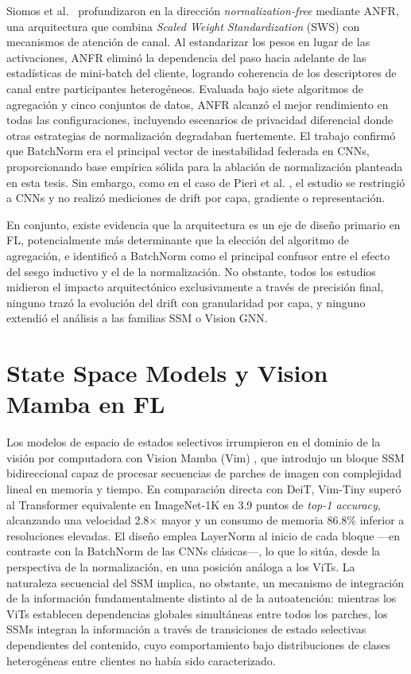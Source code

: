 Siomos et al.\ \cite{siomos2024architecture} profundizaron en la dirección
\textit{normalization-free} mediante ANFR, una arquitectura que combina \textit{Scaled Weight
Standardization} (SWS) con mecanismos de atención de canal.
Al estandarizar los pesos en lugar de las activaciones, ANFR eliminó la dependencia del paso
hacia adelante de las estadísticas de mini-batch del cliente, logrando coherencia de los
descriptores de canal entre participantes heterogéneos.
Evaluada bajo siete algoritmos de agregación y cinco conjuntos de datos, ANFR alcanzó el mejor
rendimiento en todas las configuraciones, incluyendo escenarios de privacidad diferencial donde
otras estrategias de normalización degradaban fuertemente.
El trabajo confirmó que BatchNorm era el principal vector de inestabilidad federada en CNNs,
proporcionando base empírica sólida para la ablación de normalización planteada en esta tesis.
Sin embargo, como en el caso de Pieri et al. \cite{pieri2023handlingdataheterogeneityarchitectural}, el estudio se restringió a CNNs y no realizó
mediciones de drift por capa, gradiente o representación.

En conjunto, existe evidencia que la arquitectura es un eje de diseño primario en FL,
potencialmente más determinante que la elección del algoritmo de agregación, e identificó a
BatchNorm como el principal confusor entre el efecto del sesgo inductivo y el de la normalización.
No obstante, todos los estudios midieron el impacto arquitectónico exclusivamente a través de
precisión final, ninguno trazó la evolución del drift con granularidad por capa, y ninguno
extendió el análisis a las familias SSM o Vision GNN.


\section{State Space Models y Vision Mamba en FL}

Los modelos de espacio de estados selectivos irrumpieron en el dominio de la visión por computadora
con Vision Mamba (Vim) \cite{zhu2024vision}, que introdujo un bloque SSM bidireccional capaz de
procesar secuencias de parches de imagen con complejidad lineal en memoria y tiempo.
En comparación directa con DeiT, Vim-Tiny superó al Transformer equivalente en ImageNet-1K en
3.9 puntos de \textit{top-1 accuracy}, alcanzando una velocidad 2.8$\times$ mayor y un consumo
de memoria 86.8\% inferior a resoluciones elevadas.
El diseño emplea LayerNorm al inicio de cada bloque ---en contraste con la BatchNorm de las CNNs
clásicas---, lo que lo sitúa, desde la perspectiva de la normalización, en una posición análoga a
los ViTs.
La naturaleza secuencial del SSM implica, no obstante, un mecanismo de integración de la
información fundamentalmente distinto al de la autoatención: mientras los ViTs establecen
dependencias globales simultáneas entre todos los parches, los SSMs integran la información a
través de transiciones de estado selectivas dependientes del contenido, cuyo comportamiento bajo
distribuciones de clases heterogéneas entre clientes no había sido caracterizado.

